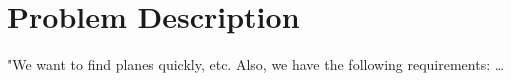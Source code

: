 \documentclass[main.tex]{subfiles}
\begin{document}
\section{Problem Description}
"We want to find planes quickly, etc. Also, we have the following requirements: …
\end{document}
